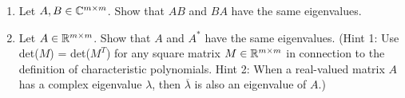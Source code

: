 \documentclass{article}
\begin{document}
\begin{enumerate}
\begin{enumerate}
\begin{proof}
Take any $A \in \C^{m\times m}$ to be invertible. Then we have inverse, $A^{-1}$ exists such that, 
\[
    AA^{-1} = \mathrm{I}_m = A^{-1}A
\]
We also have by the fact that $\lambda \neq 0$ is an eigenvalue of $A$ that, 
\[
    \text{det}(A - \lambda\mathrm{I}_m) = 0
\]
We can substitute for $\I_m$.
\[
    \text{det}(A - \lambda\I_m) = \text{det}(A - \lambda(A^{-1}A)) = \text{det}(A)\text{det}(\I_m - \lambda A^{-1}) = 0 
\]
\[
    \text{det}(I_m - \lambda A^{-1}) = -\text{det}(A^{-1} - \frac{1}{\lambda}\I_m) = 0
\]
\[
    \text{det}(A^{-1} - \frac{1}{\lambda}\I_m) = 0
\]
Therefore, $\lambda^{-1}$ is an eigenvalue of $A^{-1}$.

\end{proof}


\item 
Let $A, B \in \mathbb{C}^{m\times m}$. Show that $AB$ and $BA$ have the same eigenvalues.

\item 
Let $A \in \mathbb{R}^{m \times m}$. Show that $A$ and $A^*$ have the same eigenvalues.
(Hint 1: Use det($M$) = det($M^T$) for any square matrix $M \in \mathbb{R}^{m\times m}$
in connection to the definition of characteristic polynomials. Hint 2:
When a real-valued matrix $A$ has a complex eigenvalue $\lambda$, then $\overline{\lambda}$ is
also an eigenvalue of $A$.)


    \end{enumerate}
\end{enumerate}
\end{document}
